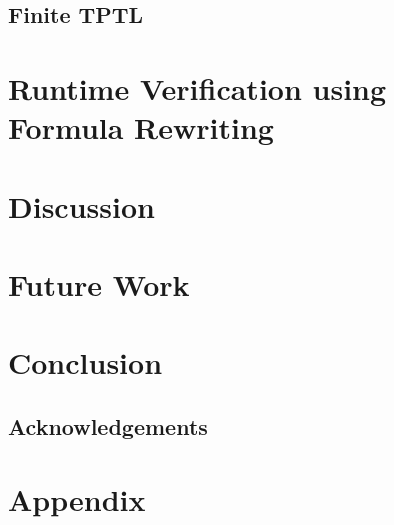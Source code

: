 \documentclass[a4paper]{article}
\begin{document}
\subsection{Finite TPTL}
\section{Runtime Verification using Formula Rewriting}
\section{Discussion}
\section{Future Work}
\section{Conclusion}
\subsection{Acknowledgements}

\nocite{*}
\printbibliography{}
\newpage
\section{Appendix}\label{appendix}
\end{document}

